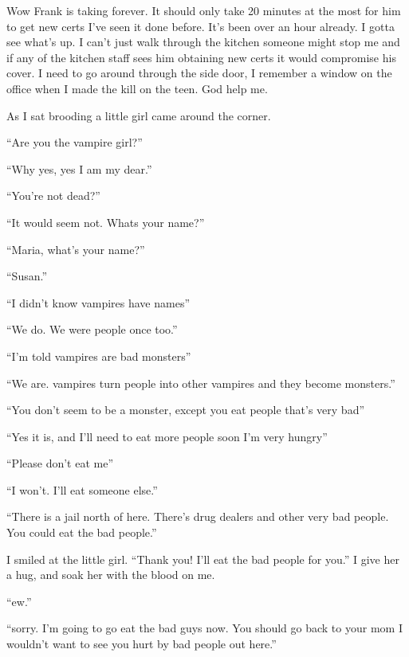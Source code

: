 Wow Frank is taking forever. It should only take 20 minutes at the most for him to get new certs I've seen it done before. It's been over an hour already. I gotta see what's up. I can't just walk through the kitchen someone might stop me and if any of the kitchen staff sees him obtaining new certs it would compromise his cover. I need to go around through the side door, I remember a window on the office when I made the kill on the teen. God help me.





















As I sat brooding a little girl came around the corner.

``Are you the vampire girl?''

``Why yes, yes I am my dear.''

``You're not dead?''

``It would seem not. Whats your name?''

``Maria, what's your name?''

``Susan.''

``I didn't know vampires have names''

``We do. We were people once too.''

``I'm told vampires are bad monsters''

``We are. vampires turn people into other vampires and they become monsters.''

``You don't seem to be a monster, except you eat people that's very bad''

``Yes it is, and I'll need to eat more people soon I'm very hungry''

``Please don't eat me''

``I won't. I'll eat someone else.''

``There is a jail north of here. There's drug dealers and other very bad people. You could eat the bad people.''

I smiled at the little girl. ``Thank you! I'll eat the bad people for you.'' I give her a hug, and soak her with the blood on me.

``ew.''

``sorry. I'm going to go eat the bad guys now. You should go back to your mom I wouldn't want to see you hurt by bad people out here.''


